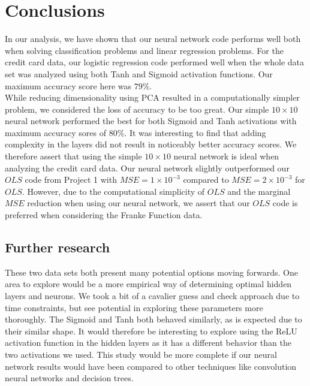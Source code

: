 \documentclass{emulateapj}
\begin{document}
\section{Conclusions}
In our analysis, we have shown that our neural network code performs well both when solving classification problems and linear regression problems. For the credit card data, our logistic regression code performed well when the whole data set was analyzed using both Tanh and Sigmoid activation functions. Our maximum accuracy score here was $79\%$.\\ While reducing dimensionality using PCA resulted in a computationally simpler problem, we considered the loss of accuracy to be too great. Our simple $10\times10$ neural network performed the best for both Sigmoid and Tanh activations with maximum accuracy sores of $80\%$. It was interesting to find that adding complexity in the layers did not result in noticeably better accuracy scores. We therefore assert that using the simple $10\times10$ neural network is ideal when analyzing the credit card data. Our neural network slightly outperformed our $OLS$ code from Project 1 with $MSE = 1\times10^{-3}$ compared to $MSE = 2\times10^{-3}$ for $OLS$. However, due to the computational simplicity of $OLS$ and the marginal $MSE$ reduction when using our neural network, we assert that our $OLS$ code is preferred when considering the Franke Function data.


\subsection{Further research}
These two data sets both present many potential options moving forwards. One area to explore would be a more empirical way of determining optimal hidden layers and neurons. We took a bit of a cavalier guess and check approach due to time constraints, but see potential in exploring these parameters more thoroughly. The Sigmoid and Tanh both behaved similarly, as is expected due to their similar shape. It would therefore be interesting to explore using the ReLU activation function in the hidden layers as it has a different behavior than the two activations we used.
This study would be more complete if our neural network results would have been compared to other techniques like convolution neural networks and decision trees. \\
\pagebreak
\iffalse
((From Figure ?? it is possible to study the performance of the neural network algorithm analysing the convergence to 0 of the $MSE$ for different batch sizes over 100 epochs.
At the same time, this behaviour can be observed in Figure ??,  where we notice the gradual increase of $R^2$-score towards 1.))
\fi
\end{document}
